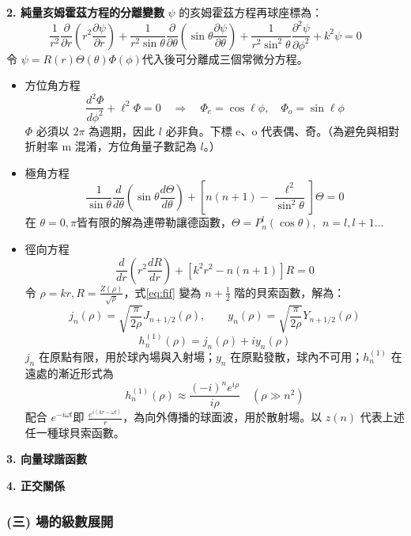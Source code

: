 \textbf{2. 純量亥姆霍茲方程的分離變數}
$\psi$ 的亥姆霍茲方程再球座標為：
\begin{equation}
    \frac{1}{r^2} \frac{\partial}{\partial r} \left( r^2 \frac{\partial \psi}{\partial r} \right) + \frac{1}{r^2 \sin\theta} \frac{\partial}{\partial \theta} \left( \sin\theta \frac{\partial \psi}{\partial \theta} \right) + \frac{1}{r^2 \sin^2\theta} \frac{\partial^2 \psi}{\partial \phi^2} + k^2 \psi = 0
\end{equation}
令 $\psi = R\left(r\right) \Theta\left(\theta\right) \Phi \left(\phi\right)$代入後可分離成三個常微分方程。
\begin{itemize}
    \item[(1)] {方位角方程 
        \begin{equation}
            \frac{d^2 \Phi}{d\phi^2} + \ell^2 \Phi = 0 \quad \Rightarrow \quad \Phi_e = \cos\ell\phi, \quad \Phi_o = \sin\ell\phi
        \end{equation}
        $\Phi$ 必須以 $2\pi$ 為週期，因此 $l$ 必非負。下標 e、o 代表偶、奇。（為避免與相對折射率 m 混淆，方位角量子數記為 $l$。）
        } 
    \item[(2)] {極角方程
        \begin{equation}
            \frac{1}{\sin\theta} \frac{d}{d\theta} \left( \sin\theta \frac{d\Theta}{d\theta} \right) + \left[ n(n+1) - \frac{\ell^2}{\sin^2\theta} \right] \Theta = 0
        \end{equation}
        在 $\theta = 0, \pi$皆有限的解為連帶勒讓德函數，\(\Theta = P_{n}^l \left(\cos \theta\right),\ \ n = l, l+1 \dots\)
        }
    \item[(3)] {徑向方程
        \begin{equation}
            \frac{d}{dr} \left( r^2 \frac{dR}{dr} \right) + [k^2 r^2 - n(n+1)]R = 0 \label{eq:fif}
        \end{equation}
        令 $\rho = kr, R = \frac{Z\left(\rho\right)}{\sqrt{\rho}}$，式\eqref{eq:fif} 變為 \(n + \frac{1}{2}\) 階的貝索函數，解為：
        \begin{equation}
            j_n(\rho) = \sqrt{\frac{\pi}{2\rho}} J_{n+1/2}(\rho), \qquad y_n(\rho) = \sqrt{\frac{\pi}{2\rho}} Y_{n+1/2}(\rho)
        \end{equation}
        \begin{equation}
            h_n^{(1)}(\rho) = j_n(\rho) + i y_n(\rho)
        \end{equation}
        $j_n$ 在原點有限，用於球內場與入射場；$y_n$ 在原點發散，球內不可用；$h^{\left(1\right)}_n$ 在遠處的漸近形式為
        \begin{equation}
            h_n^{(1)}(\rho) \approx \frac{(-i)^n e^{i\rho}}{i\rho} \quad (\rho \gg n^2)
        \end{equation}
        配合 $e^{-i\omega t} $即 $\frac{e^{i(kr-\omega t)}}{r}$，為向外傳播的球面波，用於散射場。以 $z\left(n\right)$ 代表上述任一種球貝索函數。
        }
\end{itemize}


\textbf{3. 向量球諧函數}


\textbf{4. 正交關係}

\subsubsection*{(三) 場的級數展開} 